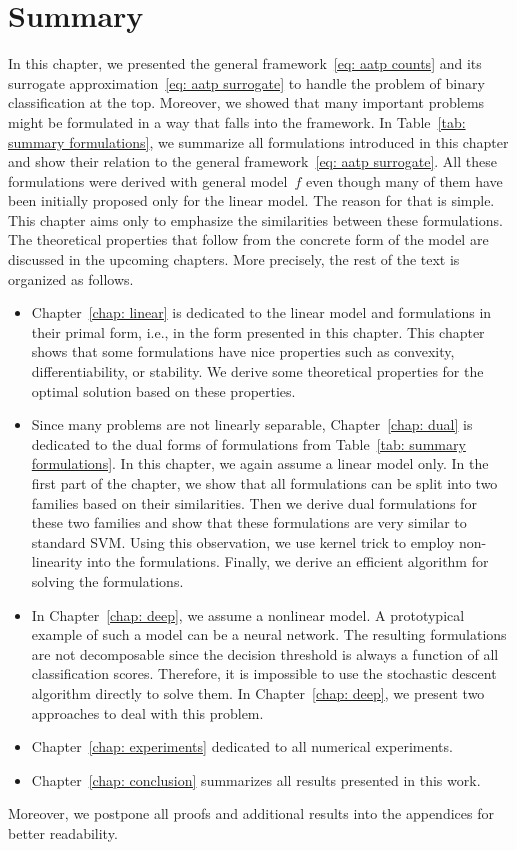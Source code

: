 \section{Summary}

In this chapter, we presented the general framework~\eqref{eq: aatp counts} and its surrogate approximation~\eqref{eq: aatp surrogate} to handle the problem of binary classification at the top. Moreover, we showed that many important problems might be formulated in a way that falls into the framework. In Table~\ref{tab: summary formulations}, we summarize all formulations introduced in this chapter and show their relation to the general framework~\eqref{eq: aatp surrogate}. All these formulations were derived with general model~$f$ even though many of them have been initially proposed only for the linear model. The reason for that is simple. This chapter aims only to emphasize the similarities between these formulations. The theoretical properties that follow from the concrete form of the model are discussed in the upcoming chapters. More precisely, the rest of the text is organized as follows.
\begin{itemize}
  \item Chapter~\ref{chap: linear} is dedicated to the linear model and formulations in their primal form, i.e., in the form presented in this chapter. This chapter shows that some formulations have nice properties such as convexity, differentiability, or stability. We derive some theoretical properties for the optimal solution based on these properties.
  \item Since many problems are not linearly separable, Chapter~\ref{chap: dual} is dedicated to the dual forms of formulations from Table~\ref{tab: summary formulations}.
  In this chapter, we again assume a linear model only. In the first part of the chapter, we show that all formulations can be split into two families based on their similarities. Then we derive dual formulations for these two families and show that these formulations are very similar to standard SVM. Using this observation, we use kernel trick to employ non-linearity into the formulations. Finally, we derive an efficient algorithm for solving the formulations.
  \item In Chapter~\ref{chap: deep}, we assume a nonlinear model. A prototypical example of such a model can be a neural network. The resulting formulations are not decomposable since the decision threshold is always a function of all classification scores. Therefore, it is impossible to use the stochastic descent algorithm directly to solve them. In Chapter~\ref{chap: deep}, we present two approaches to deal with this problem.
  \item Chapter~\ref{chap: experiments} dedicated to all numerical experiments.
  \item Chapter~\ref{chap: conclusion}  summarizes all results presented in this work. 
\end{itemize}
Moreover, we postpone all proofs and additional results into the appendices for better readability.

